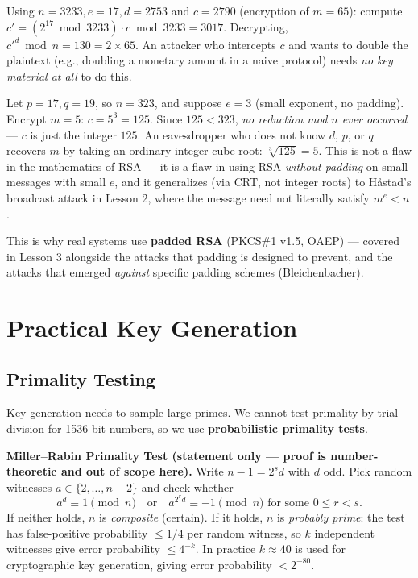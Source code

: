 \begin{example}
Using $n=3233, e=17, d=2753$ and $c = 2790$ (encryption of $m=65$): compute $c' = (2^{17} \bmod 3233) \cdot c \bmod 3233 = 3017$. Decrypting, $c'^{d} \bmod n = 130 = 2 \times 65$. An attacker who intercepts $c$ and wants to double the plaintext (e.g., doubling a monetary amount in a naive protocol) needs \emph{no key material at all} to do this.
\end{example}

\begin{example}
Let $p=17, q=19$, so $n = 323$, and suppose $e=3$ (small exponent, no padding). Encrypt $m=5$: $c = 5^3 = 125$. Since $125 < 323$, \emph{no reduction mod $n$ ever occurred} — $c$ is just the integer $125$. An eavesdropper who does not know $d$, $p$, or $q$ recovers $m$ by taking an ordinary integer cube root: $\sqrt[3]{125} = 5$. This is not a flaw in the mathematics of RSA — it is a flaw in using RSA \emph{without padding} on small messages with small $e$, and it generalizes (via CRT, not integer roots) to Håstad's broadcast attack in Lesson 2, where the message need not literally satisfy $m^e < n$.
\end{example}

This is why real systems use \textbf{padded RSA} (PKCS\#1 v1.5, OAEP) — covered in Lesson 3 alongside the attacks that padding is designed to prevent, and the attacks that emerged \emph{against} specific padding schemes (Bleichenbacher).

\newpage
\section{Practical Key Generation}

\subsection{Primality Testing}

Key generation needs to sample large primes. We cannot test primality by trial division for 1536-bit numbers, so we use \textbf{probabilistic primality tests}.

\medskip\noindent\textbf{Miller--Rabin Primality Test (statement only — proof is number-theoretic and out of scope here).} Write $n - 1 = 2^{s} d$ with $d$ odd. Pick random witnesses $a \in \{2, \dots, n-2\}$ and check whether
\[
a^{d} \equiv 1 \pmod n \quad \text{or} \quad a^{2^{r} d} \equiv -1 \pmod n \text{ for some } 0 \le r < s.
\]
If neither holds, $n$ is \emph{composite} (certain). If it holds, $n$ is \emph{probably prime}: the test has false-positive probability $\le 1/4$ per random witness, so $k$ independent witnesses give error probability $\le 4^{-k}$. In practice $k \approx 40$ is used for cryptographic key generation, giving error probability $< 2^{-80}$.

